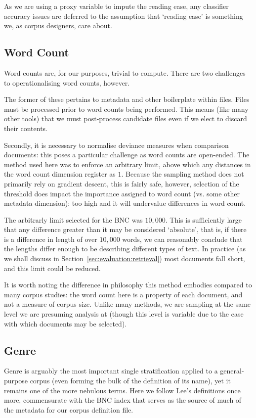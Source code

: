 As we are using a proxy variable to impute the reading ease, any classifier accuracy issues are deferred to the assumption that `reading ease' is something we, as corpus designers, care about.






\subsection{Word Count}
Word counts are, for our purposes, trivial to compute.  There are two challenges to operationalising word counts, however.

The former of these pertains to metadata and other boilerplate within files.  Files must be processed prior to word counts being performed.  This means (like many other tools) that we must post-process candidate files even if we elect to discard their contents.

Secondly, it is necessary to normalise deviance measures when comparison documents: this poses a particular challenge as word counts are open-ended.  The method used here was to enforce an arbitrary limit, above which any distances in the word count dimension register as $1$.  Because the sampling method does not primarily rely on gradient descent, this is fairly safe, however, selection of the threshold does impact the importance assigned to word count (vs. some other metadata dimension): too high and it will undervalue differences in word count.

The arbitrarly limit selected for the BNC was $10,000$.  This is sufficiently large that any difference greater than it may be considered `absolute', that is, if there is a difference in length of over $10,000$ words, we can reasonably conclude that the lengths differ enough to be describing different types of text.  In practice (as we shall discuss in Section~\ref{sec:evaluation:retrieval}) most documents fall short, and this limit could be reduced.

It is worth noting the difference in philosophy this method embodies compared to many corpus studies: the word count here is a property of each document, and not a measure of corpus size.  Unlike many methods, we are sampling at the same level we are presuming analysis at (though this level is variable due to the ease with which documents may be selected).






\subsection{Genre}
Genre is arguably the most important single stratification applied to a general-purpose corpus (even forming the bulk of the definition of its name), yet it remains one of the more nebulous terms.  Here we follow Lee's definitions once more, commensurate with the BNC index that serves as the source of much of the metadata for our corpus definition file.


